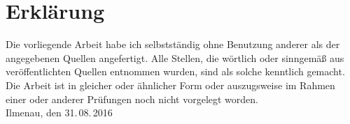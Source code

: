 %
%
%
%

\chapter*{Erklärung}

Die vorliegende Arbeit habe ich selbstständig ohne Benutzung anderer als der
angegebenen Quellen angefertigt. Alle Stellen, die wörtlich oder sinngemäß
aus veröffentlichten Quellen entnommen wurden, sind als solche
kenntlich gemacht. Die Arbeit ist in gleicher oder ähnlicher Form oder
auszugsweise im Rahmen einer oder anderer Prüfungen noch nicht vorgelegt
worden.
\\[2cm]
Ilmenau, den 31.\,08.\,2016\hfill \namedesautors
